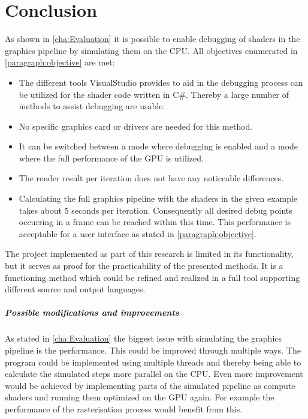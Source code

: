 
\chapter{Conclusion}\label{cha:Conclusion}

As shown in \autoref{cha:Evaluation} it is possible to enable debugging of shaders in the graphics pipeline by simulating them on the CPU. All objectives enumerated in \autoref{paragraph:objective} are met:

\begin{itemize}
\item The different tools VisualStudio provides to aid in the debugging process can be utilized for the shader code written in C\#. Thereby a large number of methods to assist debugging are usable.
\item No specific graphics card or drivers are needed for this method. 
\item It can be switched between a mode where debugging is enabled and a mode where the full performance of the GPU is utilized.
\item The render result per iteration does not have any noticeable differences.
\item Calculating the full graphics pipeline with the shaders in the given example takes about 5 seconds per iteration. Consequently all desired debug points occurring in a frame can be reached within this time. This performance is acceptable for a user interface as stated in \autoref{paragraph:objective}.
\end{itemize}

The project implemented as part of this research is limited in its functionality, but it serves as proof for the practicability of the presented methods. It is a functioning method which could be refined and realized in a full tool supporting different source and output languages.

\paragraph{Possible modifications and improvements}

As stated in \autoref{cha:Evaluation} the biggest issue with simulating the graphics pipeline is the performance. This could be improved through multiple ways. The program could be implemented using multiple threads and thereby being able to calculate the simulated steps more parallel on the CPU. Even more improvement would be achieved by implementing parts of the simulated pipeline as compute shaders and running them optimized on the GPU again. For example the performance of the rasterisation process would benefit from this.

